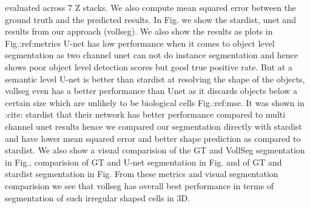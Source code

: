 \documentclass[letterpaper,compsoc,twoside]{IEEEtran}
\begin{document}
evaluated across 7 Z stacks. We also compute mean squared error between the ground truth and the predicted results. In Fig. we show the stardist, unet and results from our approach (vollseg). We also show the results as plots in Fig.:ref:metrics U-net has low performance when it comes to object level segmentation as two channel unet can not do instance segmentation and hence shows poor object level detection scores but good true positive rate. But at a semantic level U-net is better than stardist at resolving the shape of the objects, vollseg even has a better performance than Unet as it discards objects below a certain size which are unlikely to be biological cells Fig.:ref:mse.
It was shown in :cite: stardist that their network has better performance compared to multi channel unet results hence we compared our segmentation directly with stardist and have lower mean squared error and better shape prediction as compared to stardist. We also show a visual comparision of the GT and VollSeg segmentation in Fig., comparision of GT and U-net segmentation in Fig. and of GT and stardist segmentation in Fig. From these metrics and visual segmentation comparision we see that vollseg has overall best performance in terms of segmentation of such irregular shaped cells in 3D.\begin{figure}[]
\label{fig-metrics}\noindent{}

\end{figure}
\end{document}
